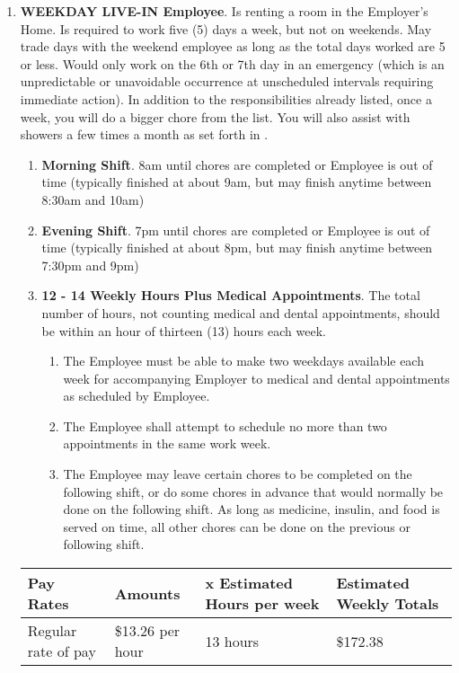 \documentclass[]{article}
\newcommand{\sw}{.15\textwidth}
\newcommand{\bw}{.39\textwidth}
\newcommand{\weekday}{WEEKDAY LIVE-IN Employee}
\begin{document}
\begin{enumerate}
\begin{tabular}{|p{\bw}|p{\sw}|p{\sw}|p{\sw}|}
			\hline
		\end{tabular}
	\item \textbf{\weekday{}}. \label{weekday}
		Is renting a room in the Employer's Home. Is required to work five (5) days a week, but not on weekends. May trade days with the weekend employee as long as the total days worked are 5 or less. Would only work on the 6th or 7th day in an emergency (which is an unpredictable or unavoidable occurrence at unscheduled intervals requiring immediate action). In addition to the responsibilities already listed, once a week, you will do a bigger chore from the \bigchores{} list. You will also assist with showers a few times a month as set forth in \shower{}. 
		\begin{enumerate}
			\item \textbf{Morning Shift}. 8am until chores are completed or Employee is out of time (typically finished at about 9am, but may finish anytime between 8:30am and 10am)
			\item \textbf{Evening Shift}. 7pm until chores are completed or Employee is out of time (typically finished at about 8pm, but may finish anytime between 7:30pm and 9pm)
			\item \textbf{12 - 14 Weekly Hours Plus Medical Appointments}. The total number of hours, not counting medical and dental appointments, should be within an hour of thirteen (13) hours each week. 
				\begin{enumerate}
					\item The Employee must be able to make two weekdays available each week for accompanying Employer to medical and dental appointments as scheduled by Employee.
					\item The Employee shall attempt to schedule no more than two appointments in the same work week.
					\item The Employee may leave certain chores to be completed on the following shift, or do some chores in advance that would normally be done on the following shift. As long as medicine, insulin, and food is served on time, all other chores can be done on the previous or following shift.
				\end{enumerate}
		\end{enumerate}
		\begin{tabular}{|p{\bw}|p{\sw}|p{\sw}|p{\sw}|}
			\hline
			\rowcolor{medgray}
			Pay Rates & Amounts & x Estimated Hours per week & Estimated Weekly Totals\\ \hline
			Regular rate of pay & \$13.26 per hour & 13 hours & \$172.38\\ \hline

\end{tabular}
\end{enumerate}
\end{document}
